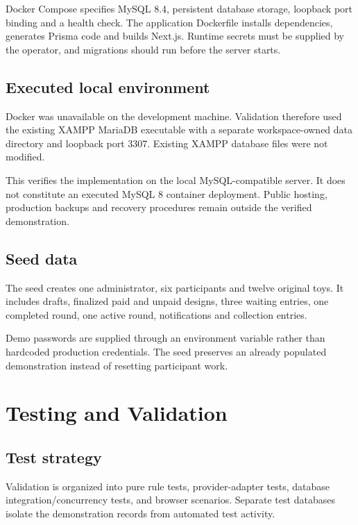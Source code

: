 \documentclass[11pt,a4paper]{article}
\begin{document}
Docker Compose specifies MySQL 8.4, persistent database storage, loopback port binding and a health check. The application Dockerfile installs dependencies, generates Prisma code and builds Next.js. Runtime secrets must be supplied by the operator, and migrations should run before the server starts.

\subsection{Executed local environment}
Docker was unavailable on the development machine. Validation therefore used the existing XAMPP MariaDB executable with a separate workspace-owned data directory and loopback port 3307. Existing XAMPP database files were not modified.

This verifies the implementation on the local MySQL-compatible server. It does not constitute an executed MySQL 8 container deployment. Public hosting, production backups and recovery procedures remain outside the verified demonstration.

\subsection{Seed data}
The seed creates one administrator, six participants and twelve original toys. It includes drafts, finalized paid and unpaid designs, three waiting entries, one completed round, one active round, notifications and collection entries.

Demo passwords are supplied through an environment variable rather than hardcoded production credentials. The seed preserves an already populated demonstration instead of resetting participant work.

\section{Testing and Validation}

\subsection{Test strategy}
Validation is organized into pure rule tests, provider-adapter tests, database integration/concurrency tests, and browser scenarios. Separate test databases isolate the demonstration records from automated test activity.
\end{document}
